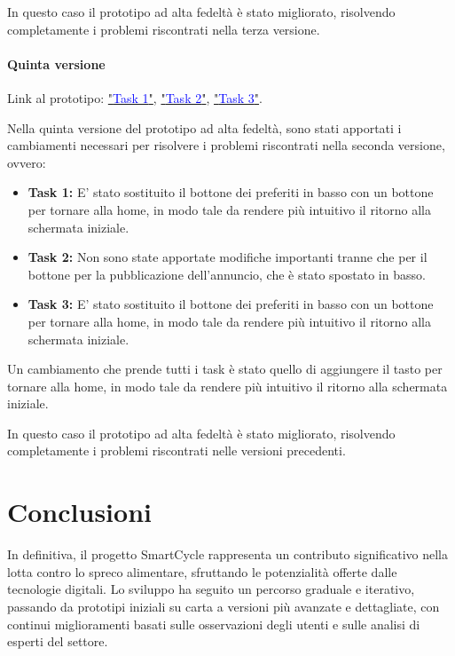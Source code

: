 \documentclass{article}
\begin{document}
In questo caso il prototipo ad alta fedeltà è stato migliorato, risolvendo completamente i problemi riscontrati nella terza versione.

\paragraph{Quinta versione}
\mbox{}
\newline
Link al prototipo: \href{https://www.figma.com/proto/xET26iTanAxBERu0jhT0FS/Task?node-id=247-1739&t=tFj5EITPxXz78FJi-1}{"\textcolor{blue}{Task 1}"}, \href{https://www.figma.com/proto/xET26iTanAxBERu0jhT0FS/Task?node-id=247-3067&t=tFj5EITPxXz78FJi-1}{"\textcolor{blue}{Task 2}"}, \href{https://www.figma.com/proto/xET26iTanAxBERu0jhT0FS/Task?node-id=247-7474&t=tFj5EITPxXz78FJi-1}{"\textcolor{blue}{Task 3}"}.

Nella quinta versione del prototipo ad alta fedeltà, sono stati apportati i cambiamenti necessari per risolvere i problemi riscontrati nella seconda versione, ovvero:
\begin{itemize}
    \item \textbf{Task 1:} E' stato sostituito il bottone dei preferiti in basso con un bottone per tornare alla home, in modo tale da rendere più intuitivo il ritorno alla schermata iniziale.
    \item \textbf{Task 2:} Non sono state apportate modifiche importanti tranne che per il bottone per la pubblicazione dell'annuncio, che è stato spostato in basso.
    \item \textbf{Task 3:} E' stato sostituito il bottone dei preferiti in basso con un bottone per tornare alla home, in modo tale da rendere più intuitivo il ritorno alla schermata iniziale.
\end{itemize}

Un cambiamento che prende tutti i task è stato quello di aggiungere il tasto per tornare alla home, in modo tale da rendere più intuitivo il ritorno alla schermata iniziale.

In questo caso il prototipo ad alta fedeltà è stato migliorato, risolvendo completamente i problemi riscontrati nelle versioni precedenti.


\newpage
\section{Conclusioni}

In definitiva, il progetto SmartCycle rappresenta un contributo significativo nella lotta contro lo spreco alimentare, sfruttando le potenzialità offerte dalle tecnologie digitali. Lo sviluppo ha seguito un percorso graduale e iterativo, passando da prototipi iniziali su carta a versioni più avanzate e dettagliate, con continui miglioramenti basati sulle osservazioni degli utenti e sulle analisi di esperti del settore.
\end{document}
